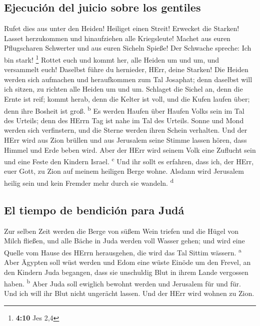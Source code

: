 \hypertarget{ejecuciuxf3n-del-juicio-sobre-los-gentiles}{%
\subsection{Ejecución del juicio sobre los
gentiles}\label{ejecuciuxf3n-del-juicio-sobre-los-gentiles}}

 Rufet dies aus unter den Heiden! Heiliget einen Streit!
Erwecket die Starken! Lasset herzukommen und hinaufziehen alle
Kriegsleute!  Machet aus euren Pflugscharen Schwerter und
aus euren Sicheln Spieße! Der Schwache spreche: Ich bin stark!
\footnote{\textbf{4:10} Jes 2,4}  Rottet euch und kommt
her, alle Heiden um und um, und versammelt euch! Daselbst führe du
hernieder, HErr, deine Starken!  Die Heiden werden sich
aufmachen und heraufkommen zum Tal Josaphat; denn daselbst will ich
sitzen, zu richten alle Heiden um und um.  Schlaget die
Sichel an, denn die Ernte ist reif; kommt herab, denn die Kelter ist
voll, und die Kufen laufen über; denn ihre Bosheit ist groß.
\textsuperscript{b}  Es werden Haufen über Haufen Volks
sein im Tal des Urteils; denn des HErrn Tag ist nahe im Tal des Urteils.
 Sonne und Mond werden sich verfinstern, und die Sterne
werden ihren Schein verhalten.  Und der HErr wird aus
Zion brüllen und aus Jerusalem seine Stimme lassen hören, dass Himmel
und Erde beben wird. Aber der HErr wird seinem Volk eine Zuflucht sein
und eine Feste den Kindern Israel. \textsuperscript{c} 
Und ihr sollt es erfahren, dass ich, der HErr, euer Gott, zu Zion auf
meinem heiligen Berge wohne. Alsdann wird Jerusalem heilig sein und kein
Fremder mehr durch sie wandeln. \textsuperscript{d}

\hypertarget{el-tiempo-de-bendiciuxf3n-para-juduxe1}{%
\subsection{El tiempo de bendición para
Judá}\label{el-tiempo-de-bendiciuxf3n-para-juduxe1}}

 Zur selben Zeit werden die Berge von süßem Wein triefen
und die Hügel von Milch fließen, und alle Bäche in Juda werden voll
Wasser gehen; und wird eine Quelle vom Hause des HErrn herausgehen, die
wird das Tal Sittim wässern. \textsuperscript{a}  Aber
Ägypten soll wüst werden und Edom eine wüste Einöde um den Frevel, an
den Kindern Juda begangen, dass sie unschuldig Blut in ihrem Lande
vergossen haben. \textsuperscript{b}  Aber Juda soll
ewiglich bewohnt werden und Jerusalem für und für.  Und
ich will ihr Blut nicht ungerächt lassen. Und der HErr wird wohnen zu
Zion.
